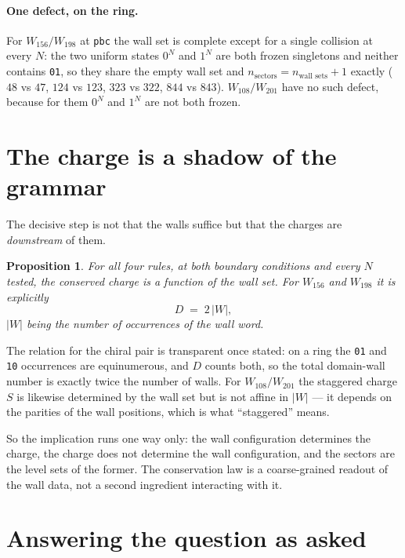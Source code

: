 \documentclass[11pt]{article}
\newcommand{\rt}[1]{\texttt{#1}}
\theoremstyle{plain}
\newtheorem{proposition}{Proposition}
\begin{document}
\paragraph{One defect, on the ring.} For $W_{156}/W_{198}$ at \rt{pbc} the wall
set is complete except for a single collision at every $N$: the two uniform
states $0^N$ and $1^N$ are both frozen singletons and neither contains \rt{01},
so they share the empty wall set and $n_{\text{sectors}} = n_{\text{wall sets}}
+ 1$ exactly ($48$ vs $47$, $124$ vs $123$, $323$ vs $322$, $844$ vs $843$).
$W_{108}/W_{201}$ have no such defect, because for them $0^N$ and $1^N$ are not
both frozen.

\section{The charge is a shadow of the grammar}

The decisive step is not that the walls suffice but that the charges are
\emph{downstream} of them.

\begin{proposition}
For all four rules, at both boundary conditions and every $N$ tested, the
conserved charge is a function of the wall set. For $W_{156}$ and $W_{198}$ it is
explicitly
\[
D \;=\; 2\,|W| ,
\]
$|W|$ being the number of occurrences of the wall word.
\end{proposition}

\noindent The relation for the chiral pair is transparent once stated: on a ring
the \rt{01} and \rt{10} occurrences are equinumerous, and $D$ counts both, so the
total domain-wall number is exactly twice the number of walls. For
$W_{108}/W_{201}$ the staggered charge $S$ is likewise determined by the wall set
but is not affine in $|W|$ --- it depends on the parities of the wall positions,
which is what ``staggered'' means.

So the implication runs one way only: the wall configuration determines the
charge, the charge does not determine the wall configuration, and the sectors are
the level sets of the former. The conservation law is a coarse-grained readout of
the wall data, not a second ingredient interacting with it.

\section{Answering the question as asked}
\end{document}

